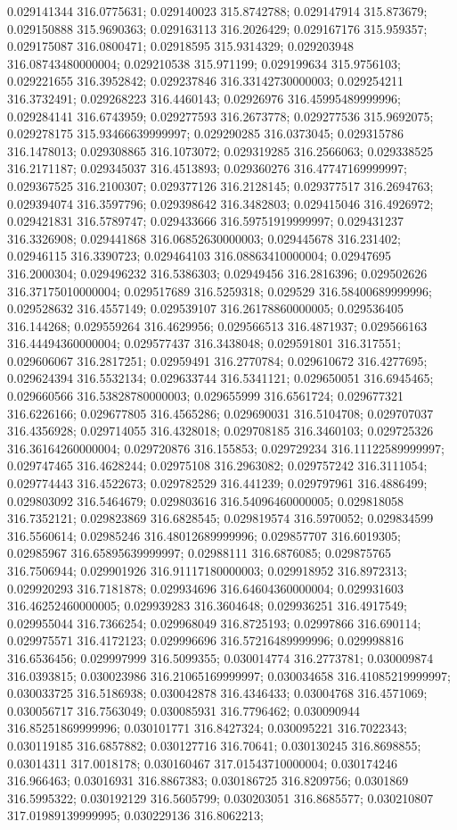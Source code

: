 0.029141344 316.0775631; 0.029140023 315.8742788; 0.029147914 315.873679; 0.029150888 315.9690363; 0.029163113 316.2026429; 0.029167176 315.959357; 0.029175087 316.0800471; 0.02918595 315.9314329; 0.029203948 316.08743480000004; 0.029210538 315.971199; 0.029199634 315.9756103; 0.029221655 316.3952842; 0.029237846 316.33142730000003; 0.029254211 316.3732491; 0.029268223 316.4460143; 0.02926976 316.45995489999996; 0.029284141 316.6743959; 0.029277593 316.2673778; 0.029277536 315.9692075; 0.029278175 315.93466639999997; 0.029290285 316.0373045; 0.029315786 316.1478013; 0.029308865 316.1073072; 0.029319285 316.2566063; 0.029338525 316.2171187; 0.029345037 316.4513893; 0.029360276 316.47747169999997; 0.029367525 316.2100307; 0.029377126 316.2128145; 0.029377517 316.2694763; 0.029394074 316.3597796; 0.029398642 316.3482803; 0.029415046 316.4926972; 0.029421831 316.5789747; 0.029433666 316.59751919999997; 0.029431237 316.3326908; 0.029441868 316.06852630000003; 0.029445678 316.231402; 0.02946115 316.3390723; 0.029464103 316.08863410000004; 0.02947695 316.2000304; 0.029496232 316.5386303; 0.02949456 316.2816396; 0.029502626 316.37175010000004; 0.029517689 316.5259318; 0.029529 316.58400689999996; 0.029528632 316.4557149; 0.029539107 316.26178860000005; 0.029536405 316.144268; 0.029559264 316.4629956; 0.029566513 316.4871937; 0.029566163 316.44494360000004; 0.029577437 316.3438048; 0.029591801 316.317551; 0.029606067 316.2817251; 0.02959491 316.2770784; 0.029610672 316.4277695; 0.029624394 316.5532134; 0.029633744 316.5341121; 0.029650051 316.6945465; 0.029660566 316.53828780000003; 0.029655999 316.6561724; 0.029677321 316.6226166; 0.029677805 316.4565286; 0.029690031 316.5104708; 0.029707037 316.4356928; 0.029714055 316.4328018; 0.029708185 316.3460103; 0.029725326 316.36164260000004; 0.029720876 316.155853; 0.029729234 316.11122589999997; 0.029747465 316.4628244; 0.02975108 316.2963082; 0.029757242 316.3111054; 0.029774443 316.4522673; 0.029782529 316.441239; 0.029797961 316.4886499; 0.029803092 316.5464679; 0.029803616 316.54096460000005; 0.029818058 316.7352121; 0.029823869 316.6828545; 0.029819574 316.5970052; 0.029834599 316.5560614; 0.02985246 316.48012689999996; 0.029857707 316.6019305; 0.02985967 316.65895639999997; 0.02988111 316.6876085; 0.029875765 316.7506944; 0.029901926 316.91117180000003; 0.029918952 316.8972313; 0.029920293 316.7181878; 0.029934696 316.64604360000004; 0.029931603 316.46252460000005; 0.029939283 316.3604648; 0.029936251 316.4917549; 0.029955044 316.7366254; 0.029968049 316.8725193; 0.02997866 316.690114; 0.029975571 316.4172123; 0.029996696 316.57216489999996; 0.029998816 316.6536456; 0.029997999 316.5099355; 0.030014774 316.2773781; 0.030009874 316.0393815; 0.030023986 316.21065169999997; 0.030034658 316.41085219999997; 0.030033725 316.5186938; 0.030042878 316.4346433; 0.03004768 316.4571069; 0.030056717 316.7563049; 0.030085931 316.7796462; 0.030090944 316.85251869999996; 0.030101771 316.8427324; 0.030095221 316.7022343; 0.030119185 316.6857882; 0.030127716 316.70641; 0.030130245 316.8698855; 0.03014311 317.0018178; 0.030160467 317.01543710000004; 0.030174246 316.966463; 0.03016931 316.8867383; 0.030186725 316.8209756; 0.0301869 316.5995322; 0.030192129 316.5605799; 0.030203051 316.8685577; 0.030210807 317.01989139999995; 0.030229136 316.8062213; 